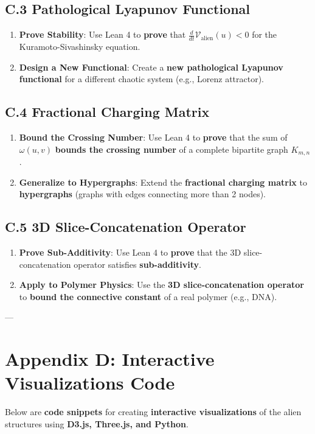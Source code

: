 \documentclass[11pt, a4paper]{article}
\begin{document}
\subsection*{C.3 Pathological Lyapunov Functional}
\begin{enumerate}
    \item \textbf{Prove Stability}: Use Lean 4 to \textbf{prove} that \(\frac{d}{dt}\mathcal{V}_{\text{alien}}(u) < 0\) for the Kuramoto-Sivashinsky equation.
    \item \textbf{Design a New Functional}: Create a \textbf{new pathological Lyapunov functional} for a different chaotic system (e.g., Lorenz attractor).
\end{enumerate}

\subsection*{C.4 Fractional Charging Matrix}
\begin{enumerate}
    \item \textbf{Bound the Crossing Number}: Use Lean 4 to \textbf{prove} that the sum of \(\omega(u, v)\) \textbf{bounds the crossing number} of a complete bipartite graph \(K_{m,n}\).
    \item \textbf{Generalize to Hypergraphs}: Extend the \textbf{fractional charging matrix} to \textbf{hypergraphs} (graphs with edges connecting more than 2 nodes).
\end{enumerate}

\subsection*{C.5 3D Slice-Concatenation Operator}
\begin{enumerate}
    \item \textbf{Prove Sub-Additivity}: Use Lean 4 to \textbf{prove} that the 3D slice-concatenation operator satisfies \textbf{sub-additivity}.
    \item \textbf{Apply to Polymer Physics}: Use the \textbf{3D slice-concatenation operator} to \textbf{bound the connective constant} of a real polymer (e.g., DNA).
\end{enumerate}

---
\newpage
\section*{Appendix D: Interactive Visualizations Code}
Below are \textbf{code snippets} for creating \textbf{interactive visualizations} of the alien structures using \textbf{D3.js, Three.js, and Python}.
\end{document}
